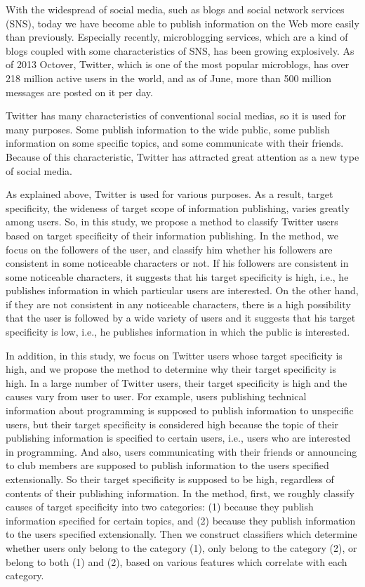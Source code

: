 \begin{eabstract}

With the widespread of social media, such as blogs and social
 network services (SNS), today we have become able to publish
 information on the Web more easily than previously.  Especially
 recently, microblogging services, which are a kind of blogs coupled
 with some characteristics of SNS, has been growing explosively. As of
 2013 Octover, Twitter, which is one of the most popular microblogs, has
 over 218 million active users in the world, and as of June, more than
 500 million messages are posted on it per day.

Twitter has many characteristics of conventional social medias, so it is
 used for many purposes. Some publish information to the wide public,
 some publish information on some specific topics, and
 some communicate with their friends. Because of this characteristic,
 Twitter has attracted great attention as a new type of social media.

As explained above, Twitter is used for various purposes.  As a result,
 target specificity, the wideness of target scope of information
 publishing, varies greatly among users.  So, in this study, we propose a
 method to classify Twitter users based on target specificity of their
 information publishing.  In the method, we focus on the followers of
 the user, and classify him whether his followers are consistent in some
 noticeable characters or not.  If his followers are consistent in some
 noticeable characters, it suggests that his target specificity is high,
 i.e., he publishes information in which particular users are
 interested. On the other hand, if they are not consistent in any
 noticeable characters, there is a high possibility that the user is
 followed by a wide variety of users and it suggests that his target
 specificity is low, i.e., he publishes information in which the public
 is interested.

In addition, in this study, we focus on Twitter users whose target
 specificity is high, and we propose the method to determine why their
 target specificity is high.  In a large number of Twitter users, their
 target specificity is high and the causes vary from user to user.  For
 example, users publishing technical information about programming is
 supposed to publish information to unspecific users, but their
 target specificity is considered high because the topic of their
 publishing information is specified to certain users, i.e., users who
 are interested in programming. And also, users communicating with their
 friends or announcing to club members are supposed to publish
 information to the users specified extensionally. So their target
 specificity is supposed to be high, regardless of contents of their
 publishing information.  In the method, first, we roughly classify
 causes of target specificity into two categories: (1) because they
 publish information specified for certain topics, and (2) because they
 publish information to the users specified extensionally.  Then we
 construct classifiers which determine whether users  only belong to the
 category (1), only belong to the category (2), or belong to both (1)
 and (2), based on various features which correlate  with each category.


\end{eabstract}
